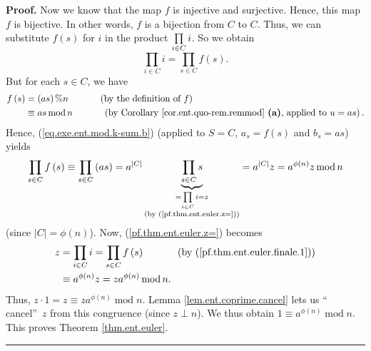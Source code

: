 \documentclass[numbers=enddot,12pt,final,onecolumn,notitlepage]{scrartcl}%
\numberwithin{exer}{subsection}
\theoremstyle{definition}
\newenvironment{proof}[1][Proof]{\noindent\textbf{#1.} }{\ \rule{0.5em}{0.5em}}
\let\prodnonlimits\prod
\renewcommand{\prod}{\prodnonlimits\limits}
\begin{document}
\begin{proof}
Now we know that the map $f$ is injective and surjective. Hence, this map $f$
is bijective. In other words, $f$ is a bijection from $C$ to $C$. Thus, we can
substitute $f\left(  s\right)  $ for $i$ in the product $\prod\limits_{i\in
C}i$. So we obtain%
\begin{equation}
\prod_{i\in C}i=\prod_{s\in C}f\left(  s\right)  .
\label{pf.thm.ent.euler.finale.1}%
\end{equation}
But for each $s\in C$, we have%
\begin{align*}
f\left(  s\right)   &  =\left(  as\right)  \%n\ \ \ \ \ \ \ \ \ \ \left(
\text{by the definition of }f\right) \\
&  \equiv as\operatorname{mod}n\ \ \ \ \ \ \ \ \ \ \left(  \text{by Corollary
\ref{cor.ent.quo-rem.remmod} \textbf{(a)}, applied to }u=as\right)  .
\end{align*}
Hence, (\ref{eq.exe.ent.mod.k-sum.b}) (applied to $S=C$, $a_{s}=f\left(
s\right)  $ and $b_{s}=as$) yields%
\[
\prod_{s\in C}f\left(  s\right)  \equiv\prod_{s\in C}\left(  as\right)
=a^{\left\vert C\right\vert }\underbrace{\prod_{s\in C}s}_{\substack{=\prod
_{i\in C}i=z\\\text{(by (\ref{pf.thm.ent.euler.z=}))}}}=a^{\left\vert
C\right\vert }z=a^{\phi\left(  n\right)  }z\operatorname{mod}n
\]
(since $\left\vert C\right\vert =\phi\left(  n\right)  $). Now,
(\ref{pf.thm.ent.euler.z=}) becomes%
\begin{align*}
z  &  =\prod_{i\in C}i=\prod_{s\in C}f\left(  s\right)
\ \ \ \ \ \ \ \ \ \ \left(  \text{by (\ref{pf.thm.ent.euler.finale.1})}\right)
\\
&  \equiv a^{\phi\left(  n\right)  }z=za^{\phi\left(  n\right)  }%
\operatorname{mod}n.
\end{align*}
Thus, $z\cdot1=z\equiv za^{\phi\left(  n\right)  }\operatorname{mod}n$. Lemma
\ref{lem.ent.coprime.cancel} lets us \textquotedblleft
cancel\textquotedblright\ $z$ from this congruence (since $z\perp n$). We thus
obtain $1\equiv a^{\phi\left(  n\right)  }\operatorname{mod}n$. This proves
Theorem \ref{thm.ent.euler}.
\end{proof}
\end{document}
